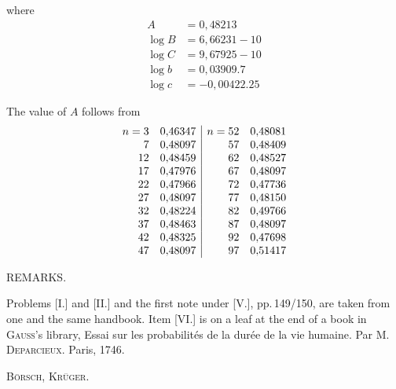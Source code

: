 where
\[
\begin{array}{rl}
A &= 0{,}48213\\
\log B &= 6{,}66231 - 10\\
\log C &= 9{,}67925 - 10\\
\log b &= 0{,}03909.7 \\
\log c &= -0{,}00422.25
\end{array}
\]


The value of $A$ follows from
\[
\begin{array}{r@{\quad}l|r@{\quad}l}
n=3 & 0{,}46347 & n=52 & 0{,}48081\\
7 & 0{,}48097 & 57 & 0{,}48409\\
12 & 0{,}48459 & 62 & 0{,}48527\\
17 & 0{,}47976 & 67 & 0{,}48097\\
22 & 0{,}47966 & 72 & 0{,}47736\\
27 & 0{,}48097 & 77 & 0{,}48150\\
32 & 0{,}48224 & 82 & 0{,}49766\\
37 & 0{,}48463 & 87 & 0{,}48097\\
42 & 0{,}48325 & 92 & 0{,}47698\\
47 & 0{,}48097 & 97 & 0{,}51417
\end{array}
\]

\begin{center}
REMARKS.
\end{center}

Problems [I.] and [II.] and the first note under [V.], pp.\,149/150, are taken from one and the same handbook. Item [VI.] is on a leaf at the end of a book in \textsc{Gauss}'s library, Essai sur les probabilités de la durée de la vie humaine. Par M. \textsc{Deparcieux}. Paris, 1746.

\hfill \textsc{Börsch}, \textsc{Krüger}.
